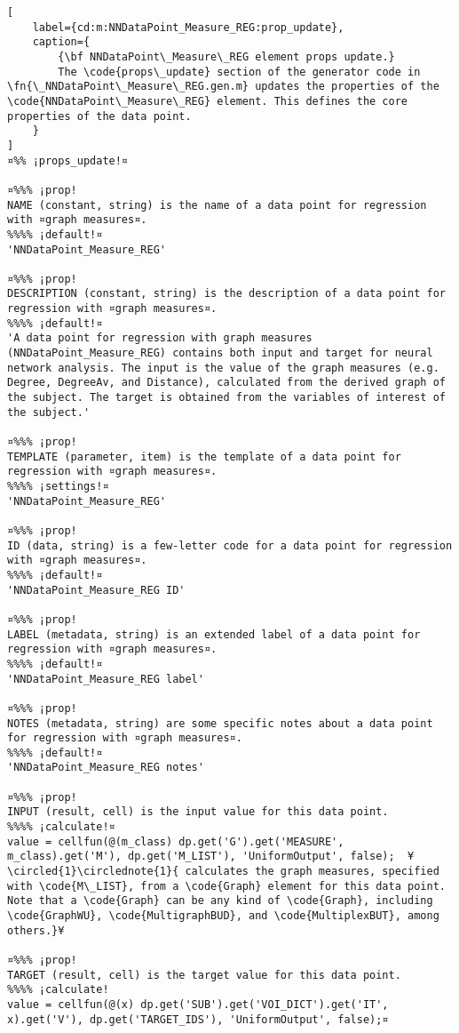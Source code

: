 \documentclass{tufte-handout}
\begin{document}
\begin{lstlisting}[
	label={cd:m:NNDataPoint_Measure_REG:prop_update},
	caption={
		{\bf NNDataPoint\_Measure\_REG element props update.}
		The \code{props\_update} section of the generator code in \fn{\_NNDataPoint\_Measure\_REG.gen.m} updates the properties of the \code{NNDataPoint\_Measure\_REG} element. This defines the core properties of the data point.
	}
]
¤%% ¡props_update!¤

¤%%% ¡prop!
NAME (constant, string) is the name of a data point for regression with ¤graph measures¤.
%%%% ¡default!¤
'NNDataPoint_Measure_REG'

¤%%% ¡prop!
DESCRIPTION (constant, string) is the description of a data point for regression with ¤graph measures¤.
%%%% ¡default!¤
'A data point for regression with graph measures (NNDataPoint_Measure_REG) contains both input and target for neural network analysis. The input is the value of the graph measures (e.g. Degree, DegreeAv, and Distance), calculated from the derived graph of the subject. The target is obtained from the variables of interest of the subject.'

¤%%% ¡prop!
TEMPLATE (parameter, item) is the template of a data point for regression with ¤graph measures¤.
%%%% ¡settings!¤
'NNDataPoint_Measure_REG'

¤%%% ¡prop!
ID (data, string) is a few-letter code for a data point for regression with ¤graph measures¤.
%%%% ¡default!¤
'NNDataPoint_Measure_REG ID'

¤%%% ¡prop!
LABEL (metadata, string) is an extended label of a data point for regression with ¤graph measures¤.
%%%% ¡default!¤
'NNDataPoint_Measure_REG label'

¤%%% ¡prop!
NOTES (metadata, string) are some specific notes about a data point for regression with ¤graph measures¤.
%%%% ¡default!¤
'NNDataPoint_Measure_REG notes'

¤%%% ¡prop!
INPUT (result, cell) is the input value for this data point.
%%%% ¡calculate!¤ 
value = cellfun(@(m_class) dp.get('G').get('MEASURE', m_class).get('M'), dp.get('M_LIST'), 'UniformOutput', false);  ¥\circled{1}\circlednote{1}{ calculates the graph measures, specified with \code{M\_LIST}, from a \code{Graph} element for this data point. Note that a \code{Graph} can be any kind of \code{Graph}, including \code{GraphWU}, \code{MultigraphBUD}, and \code{MultiplexBUT}, among others.}¥
    
¤%%% ¡prop!
TARGET (result, cell) is the target value for this data point.
%%%% ¡calculate!
value = cellfun(@(x) dp.get('SUB').get('VOI_DICT').get('IT', x).get('V'), dp.get('TARGET_IDS'), 'UniformOutput', false);¤

\end{lstlisting}
\end{document}
